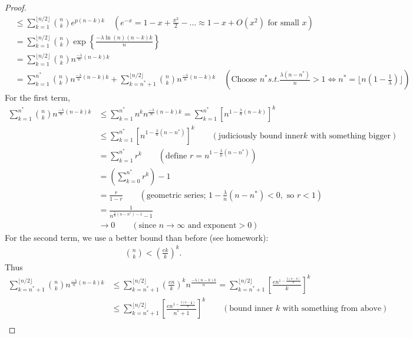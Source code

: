 \documentclass[./some_latex_template.tex]{subfiles}
\begin{document}
\begin{proof}
\begin{align*}
	&\le \sum_{k=1}^{\lfloor n/2 \rfloor} {n \choose k} e^{p(n-k)k} \quad \left(e^{-x} = 1 - x + \frac{x^2}{2} - ... \approx 1 - x + O(x^2) \text{ for small }x\right)\\
	&= \sum_{k=1}^{\lfloor n/2 \rfloor} {n \choose k} \exp\left\{\frac{-\lambda \ln(n)(n-k)k}{n}\right\}\\
	&= \sum_{k=1}^{\lfloor n/2 \rfloor} {n \choose k} n^{\frac{-\lambda}{n}(n-k)k}\\
	&= \sum_{k=1}^{n^*} {n \choose k} n^{\frac{-\lambda}{n}(n-k)k} + \sum_{k=n^* + 1}^{\lfloor n/2 \rfloor} {n \choose k} n^{\frac{-\lambda}{n}(n-k)k} \quad \left(\text{Choose } n^* s.t. \frac{\lambda(n - n^*)}{n}>1 \iff n^* = \lfloor n(1 - \frac{1}{\lambda}) \rfloor\right)
\end{align*}
For the first term, 
\begin{align*}
	\sum_{k=1}^{n^*} {n \choose k} n^{\frac{-\lambda}{n}(n-k)k}
	&\le \sum_{k=1}^{n^*} n^k n^{\frac{-\lambda}{n}(n-k)k} = \sum_{k=1}^{n^*} \left[ n^{1 - \frac{\lambda}{n}(n-k)} \right]^k\\
	&\le \sum_{k=1}^{n^*} \left[ n^{1 - \frac{\lambda}{n}(n-n^*)} \right]^k \qquad \left(\text{judiciously bound inner} k \text{ with something bigger}\right)\\
	&= \sum_{k=1}^{n^*} r^k \qquad \left(\text{define } r = n^{1 - \frac{\lambda}{n}(n-n^*)}\right)\\
	&= \left(\sum_{k=0}^{n^*} r^k\right) - 1\\
	&= \frac{r}{1-r} \qquad (\text{geometric series; } 1 - \frac{\lambda}{n}(n-n^*) < 0, \text{ so } r < 1)\\
	&= \frac{1}{n^{\frac{\lambda}{n}(n-n^*) - 1} - 1}\\
	&\longrightarrow 0 \qquad \left(\text{since } n \rightarrow \infty \text{ and exponent} > 0\right)
\end{align*}
For the second term, we use a better bound than before (see homework):
\begin{align*}
	{n \choose k} < \left(\frac{ek}{k}\right)^k.
\end{align*}
Thus 
\begin{align*}
	\sum_{k=n^* + 1}^{\lfloor n/2 \rfloor} {n \choose k} n^{\frac{-\lambda}{n}(n-k)k} 
	&\le \sum_{k=n^* + 1}^{\lfloor n/2 \rfloor} \left(\frac{en}{k}\right)^k n^{\frac{-\lambda(n-k)k}{n}} = \sum_{k=n^* + 1}^{\lfloor n/2 \rfloor} \left[ \frac{en^{1 - \frac{\lambda(n-k)}{n}}}{k}\right]^k\\
	&\le \sum_{k=n^* + 1}^{\lfloor n/2 \rfloor} \left[ \frac{en^{1-\frac{\lambda (n - \frac{n}{2})}{n}}}{n^* + 1}\right]^k \qquad (\text{bound inner } k \text{ with something from above})\\

\end{align*}
\end{proof}
\end{document}
